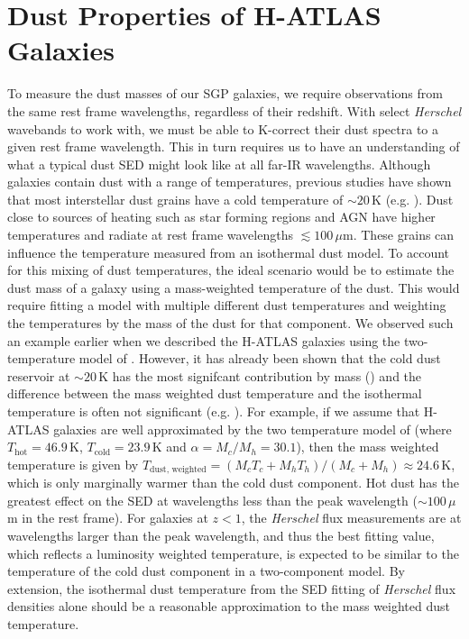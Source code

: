 \section{Dust Properties of H-ATLAS Galaxies}

To measure the dust masses of our SGP galaxies, we require observations from the same rest frame wavelengths, regardless of their redshift. With select \textit{Herschel} wavebands to work with, we must be able to K-correct their dust spectra to a given rest frame wavelength. This in turn requires us to have an understanding of what a typical dust SED might look like at all far-IR wavelengths. Although galaxies contain dust with a range of temperatures, previous studies have shown that most interstellar dust grains have a cold temperature of $\sim 20\,$K (e.g. \citealt{Dunne_2001, Vlahakis_2005, Draine_2007a, Boselli_2010, Smith_2012b, Smith_2013}). Dust close to sources of heating such as star forming regions and AGN have higher temperatures and radiate at rest frame wavelengths $\lesssim 100\,\mu$m. These grains can influence the temperature measured from an isothermal dust model. To account for this mixing of dust temperatures, the ideal scenario would be to estimate the dust mass of a galaxy using a mass-weighted temperature of the dust. This would require fitting a model with multiple different dust temperatures and weighting the temperatures by the mass of the dust for that component. We observed such an example earlier when we described the H-ATLAS galaxies using the two-temperature model of \citealt{Pearson_2013}. However, it has already been shown that the cold dust reservoir at $\sim 20\,$K has the most signifcant contribution by mass (\citealt{Pearson_2013}) and the difference between the mass weighted dust temperature and the isothermal temperature is often not significant (e.g. \citealt{Clark_2015}). For example, if we assume that H-ATLAS galaxies are well approximated by the two temperature model of \citealt{Pearson_2013} (where $T_{\textrm{hot}} = 46.9\,$K, $T_{\textrm{cold}} = 23.9\,$K and $\alpha = M_c/M_h = 30.1$), then the mass weighted temperature is given by $T_{\textrm{dust, weighted}} = (M_cT_c + M_hT_h)/(M_c + M_h) \approx 24.6\,$K, which is only marginally warmer than the cold dust component. Hot dust has the greatest effect on the SED at wavelengths less than the peak wavelength ($\sim 100\,\mu$m in the rest frame). For galaxies at $z < 1$, the \textit{Herschel} flux measurements are at wavelengths larger than the peak wavelength, and thus the best fitting value, which reflects a luminosity weighted temperature, is expected to be similar to the temperature of the cold dust component in a two-component model. By extension, the isothermal dust temperature from the SED fitting of \textit{Herschel} flux densities alone should be a reasonable approximation to the mass weighted dust temperature.

